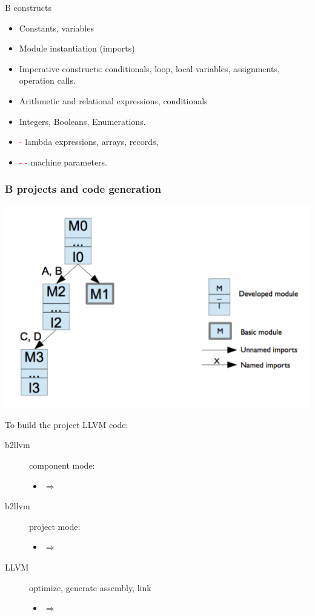 \documentclass[12pt]{beamer}
\begin{document}
\begin{frame}{B constructs}

  \begin{itemize}
    \item Constants, variables
    \item Module instantiation (imports) 
    \item Imperative constructs: conditionals, loop, local variables, assignments, operation calls.
    \item Arithmetic and relational expressions, conditionals
    \item Integers, Booleans, Enumerations.
    \item \textcolor{red}{-} lambda expressions, arrays, records,
    \item \textcolor{red}{- -} machine parameters.
  \end{itemize}
\end{frame}


\begin{frame}

  \frametitle{B projects and code generation}
	
  \includegraphics[height=.4\textheight]{B-project.pdf}

  To build the project LLVM code:
  \begin{description}
  \item[b2llvm] \alert{component} mode:
    \begin{itemize}
      \item {}   $\Longrightarrow$    
    \end{itemize}
  \item[b2llvm] \alert{project} mode:
    \begin{itemize}
      \item {} $\Longrightarrow$ 
    \end{itemize}
  \item[LLVM] optimize, generate assembly, link
    \begin{itemize}
      \item {}    \textcolor{red}{} $\Longrightarrow$ 
      \end{itemize}
  \end{description}
\end{frame}
\end{document}
